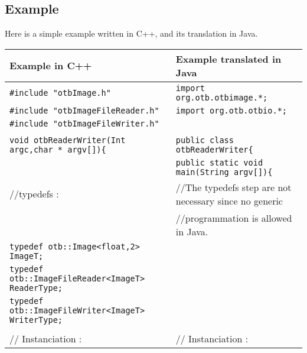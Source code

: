 \begin{landscape}
\subsection{Example}

Here is a simple example written in C++, and its translation in Java. 


\begin{table}[!htbp]
\begin{center}
\begin{tabular}{|m{8.35cm}|m{9.75cm}|}
\hline
Example in C++                  &  Example translated in Java  \\
\hline

\verb$#include "otbImage.h"$                &       \verb$import org.otb.otbimage.*;$                                 \\
\verb$#include "otbImageFileReader.h"$      &       \verb$import org.otb.otbio.*;$                                    \\
\verb$#include "otbImageFileWriter.h"$      &                                                                        \\
                                            &                                                                         \\
\verb$void otbReaderWriter(Int argc,char * argv[]){$ & \verb$public class otbReaderWriter{$        \\
                                                     &  \verb$public static void main(String argv[]){$  \\
      
 //typedefs :                              &     //The typedefs step are not necessary since no generic \\
                                           &     //programmation is allowed in Java.    \\

\verb$typedef otb::Image<float,2>  ImageT;$             &           \\
\verb$typedef otb::ImageFileReader<ImageT> ReaderType;$  &           \\
\verb$typedef otb::ImageFileWriter<ImageT> WriterType;$  &            \\

                       &                                           \\
// Instanciation :     &                      // Instanciation :   \\


\end{tabular}
\end{center}
\end{table}
\end{landscape}
